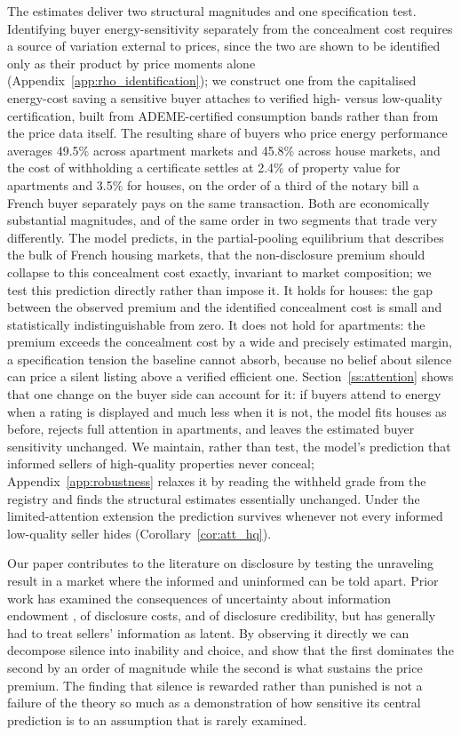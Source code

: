 The estimates deliver two structural magnitudes and one specification test. Identifying buyer
energy-sensitivity separately from the concealment cost requires a source of variation external
to prices, since the two are shown to be identified only as their product by price moments
alone (Appendix~\ref{app:rho_identification}); we construct one from the capitalised energy-cost
saving a sensitive buyer attaches to verified high- versus low-quality certification, built from
ADEME-certified consumption bands rather than from the price data itself. The resulting share of
buyers who price energy performance averages 49.5\% across apartment markets and 45.8\% across
house markets, and the cost of withholding a certificate settles at 2.4\% of property value for
apartments and 3.5\% for houses, on the order of a third of the notary bill a French buyer
separately pays on the same transaction. Both are economically substantial magnitudes, and of the
same order in two segments that trade very differently. The model predicts, in the partial-pooling
equilibrium that describes the bulk of French housing markets, that the non-disclosure premium
should collapse to this concealment cost exactly, invariant to market composition; we test this
prediction directly rather than impose it. It holds for houses: the gap between the observed
premium and the identified concealment cost is small and statistically indistinguishable from
zero. It does not hold for apartments: the premium exceeds the concealment cost by a wide and
precisely estimated margin, a specification tension the baseline cannot absorb, because no belief
about silence can price a silent listing above a verified efficient one.
Section~\ref{ss:attention} shows that one change on the buyer side can account for it: if buyers attend
to energy when a rating is displayed and much less when it is not, the model fits houses as before,
rejects full attention in apartments, and leaves the estimated buyer sensitivity unchanged.
We maintain, rather than test, the model's prediction that informed sellers of high-quality
properties never conceal; Appendix~\ref{app:robustness} relaxes it by reading the withheld grade
from the registry and finds the structural estimates essentially unchanged. Under the limited-attention
extension the prediction survives whenever not every informed low-quality seller hides (Corollary~\ref{cor:att_hq}).

Our paper contributes to the literature on disclosure by testing the unraveling result in a
market where the informed and uninformed can be told apart. Prior work has examined the
consequences of uncertainty about information endowment \citep{dye_disclosure_1985,
jung_kwon_1988}, of disclosure costs, and of disclosure credibility, but has generally had to
treat sellers' information as latent. By observing it directly we can decompose silence into
inability and choice, and show that the first dominates the second by an order of magnitude
while the second is what sustains the price premium. The finding that silence is rewarded rather
than punished is not a failure of the theory so much as a demonstration of how sensitive its
central prediction is to an assumption that is rarely examined.

